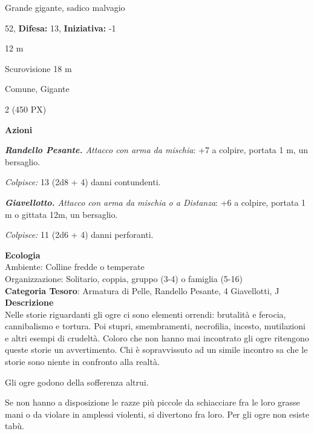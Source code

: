 \begin{multicols}{2}
{
\noindent
\begin{description}[noitemsep, topsep=0pt, parsep=0pt, partopsep=0pt, leftmargin=0cm, labelwidth=2.2cm]
	\item[\textbf{Taglia/Tipo:}] Grande gigante, sadico malvagio
	\item[\textbf{Caratt.:}] 
	\item[\textbf{Punti Ferita:}] 52,  \textbf{Difesa:} 13,  \textbf{Iniziativa:} -1
	\item[\textbf{Movimento:}] 12 m
	\item[\textbf{Tiri Salvez.:}] 
	\item[\textbf{Sensi:}] Scurovisione 18 m
	\item[\textbf{Linguaggi:}] Comune, Gigante
	\item[\textbf{Sfida:}] 2 (450 PX)\smallskip
\end{description}

\textbf{Azioni}

\emph{\textbf{Randello Pesante.} Attacco con arma da mischia}: +7 a colpire, portata 1 m, un bersaglio.

\emph{Colpisce:} 13 (2d8 + 4) danni contundenti.

\emph{\textbf{Giavellotto.} Attacco con arma da mischia o a Distanza}: +6 a colpire, portata 1 m o gittata 12m, un bersaglio.

\emph{Colpisce:} 11 (2d6 + 4) danni perforanti.

\textbf{Ecologia}\\
Ambiente: Colline fredde o temperate\\
Organizzazione: Solitario, coppia, gruppo (3-4) o famiglia (5-16)\\
\textbf{Categoria Tesoro}: Armatura di Pelle, Randello Pesante, 4 Giavellotti, J\\
\textbf{Descrizione}\\
Nelle storie riguardanti gli ogre ci sono elementi orrendi: brutalità e ferocia, cannibalismo e tortura. Poi stupri, smembramenti, necrofilia, incesto, mutilazioni e altri esempi di crudeltà. Coloro che non hanno mai incontrato gli ogre ritengono queste storie un avvertimento. Chi è sopravvissuto ad un simile incontro sa che le storie sono niente in confronto alla realtà.

Gli ogre godono della sofferenza altrui.

Se non hanno a disposizione le razze più piccole da schiacciare fra le loro grasse mani o da violare in amplessi violenti, si divertono fra loro. Per gli ogre non esiste tabù.

}
\end{multicols}
